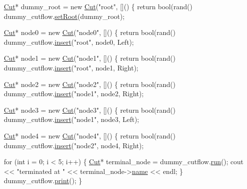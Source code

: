 \begin{DoxyEnumerate}
\begin{DoxyCode}
    \hyperlink{classCut}{Cut}* dummy\_root = \textcolor{keyword}{new} \hyperlink{classCut}{Cut}(\textcolor{stringliteral}{"root"}, []() \{ \textcolor{keywordflow}{return} bool(rand() %
    dummy\_cutflow.\hyperlink{classCutflow_ad27d37141c3748779a5d81fad919ecbb}{setRoot}(dummy\_root);

    \hyperlink{classCut}{Cut}* node0 = \textcolor{keyword}{new} \hyperlink{classCut}{Cut}(\textcolor{stringliteral}{"node0"}, []() \{ \textcolor{keywordflow}{return} bool(rand() %
    dummy\_cutflow.\hyperlink{classCutflow_a8da46f1053a6b97991489ee0920c29a1}{insert}(\textcolor{stringliteral}{"root"}, node0, Left);

    \hyperlink{classCut}{Cut}* node1 = \textcolor{keyword}{new} \hyperlink{classCut}{Cut}(\textcolor{stringliteral}{"node1"}, []() \{ \textcolor{keywordflow}{return} bool(rand() %
    dummy\_cutflow.\hyperlink{classCutflow_a8da46f1053a6b97991489ee0920c29a1}{insert}(\textcolor{stringliteral}{"root"}, node1, Right);

    \hyperlink{classCut}{Cut}* node2 = \textcolor{keyword}{new} \hyperlink{classCut}{Cut}(\textcolor{stringliteral}{"node2"}, []() \{ \textcolor{keywordflow}{return} bool(rand() %
    dummy\_cutflow.\hyperlink{classCutflow_a8da46f1053a6b97991489ee0920c29a1}{insert}(\textcolor{stringliteral}{"node1"}, node2, Right);

    \hyperlink{classCut}{Cut}* node3 = \textcolor{keyword}{new} \hyperlink{classCut}{Cut}(\textcolor{stringliteral}{"node3"}, []() \{ \textcolor{keywordflow}{return} bool(rand() %
    dummy\_cutflow.\hyperlink{classCutflow_a8da46f1053a6b97991489ee0920c29a1}{insert}(\textcolor{stringliteral}{"node1"}, node3, Left);

    \hyperlink{classCut}{Cut}* node4 = \textcolor{keyword}{new} \hyperlink{classCut}{Cut}(\textcolor{stringliteral}{"node4"}, []() \{ \textcolor{keywordflow}{return} bool(rand() %
    dummy\_cutflow.\hyperlink{classCutflow_a8da46f1053a6b97991489ee0920c29a1}{insert}(\textcolor{stringliteral}{"node2"}, node4, Right);

    \textcolor{keywordflow}{for} (\textcolor{keywordtype}{int} i = 0; i < 5; i++)
    \{
        \hyperlink{classCut}{Cut}* terminal\_node = dummy\_cutflow.\hyperlink{classCutflow_a563da4fc41aa5c611dd0ce37ce966f2c}{run}();
        cout << \textcolor{stringliteral}{"terminated at "} << terminal\_node->\hyperlink{classCut_accf700d2d00746b97a265d4aea3f55c2}{name} << endl;
    \}
    dummy\_cutflow.\hyperlink{classCutflow_a0cb4c8bd6d15ace1f85fe0cfb8d9d828}{print}();
\}
\end{DoxyCode}
 
\end{DoxyEnumerate}